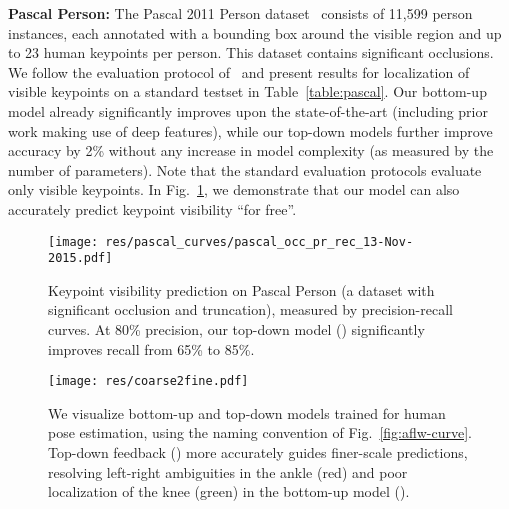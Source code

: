 \documentclass[10pt,twocolumn,letterpaper]{article}
\newcommand{\QP}[1]{{}}
\begin{document}
{\bf Pascal Person:} The Pascal 2011 Person
dataset~\cite{hariharan2011semantic} consists of 11,599 person
instances, each annotated with a bounding box around the visible
region and up to 23 human keypoints per person. This dataset contains
significant occlusions. We follow the evaluation protocol of~\cite{long2014convnets} and
present results for localization of visible keypoints on a standard
testset in Table~\ref{table:pascal}. Our bottom-up \QP{1} model
already significantly improves upon the state-of-the-art (including
prior work making use of deep features), while our top-down models
\QP{2} further improve accuracy by 2\% without any increase in model
complexity (as measured by the number of parameters). Note that the
standard evaluation protocols evaluate only visible keypoints. In
Fig.~\ref{fig:pascal-occ}, we demonstrate that our model can also
accurately predict keypoint visibility ``for free''.

\begin{figure}[t!]
  \centering
  \texttt{[image: res/pascal\_curves/pascal\_occ\_pr\_rec\_13-Nov-2015.pdf]}
  \caption{Keypoint visibility prediction on Pascal Person (a dataset with significant occlusion and truncation), measured by
    precision-recall curves. At 80\% precision, our top-down model () significantly improves recall from 65\% to 85\%.}
  \label{fig:pascal-occ}
\end{figure}



\begin{figure*}[t!]
  \centering
  \texttt{[image: res/coarse2fine.pdf]}
\caption{We visualize bottom-up and top-down models trained for human pose estimation, using the naming convention of Fig.~\ref{fig:aflw-curve}. Top-down feedback (\QP{2}) more accurately guides finer-scale predictions, resolving left-right ambiguities in the ankle (red) and poor localization of the knee (green) in the bottom-up model (\QP{1}).}
  \label{fig:coarse2fine}
\end{figure*}
\end{document}

